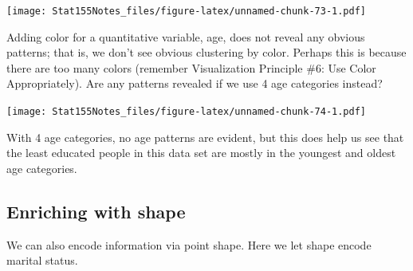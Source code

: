 \documentclass[]{book}
\newenvironment{Shaded}{\begin{snugshade}}{\end{snugshade}}
\newcommand{\CommentTok}[1]{\textcolor[rgb]{0.56,0.35,0.01}{\textit{#1}}}
\newcommand{\DataTypeTok}[1]{\textcolor[rgb]{0.13,0.29,0.53}{#1}}
\newcommand{\DecValTok}[1]{\textcolor[rgb]{0.00,0.00,0.81}{#1}}
\newcommand{\KeywordTok}[1]{\textcolor[rgb]{0.13,0.29,0.53}{\textbf{#1}}}
\newcommand{\NormalTok}[1]{#1}
\newcommand{\OperatorTok}[1]{\textcolor[rgb]{0.81,0.36,0.00}{\textbf{#1}}}
\newcommand{\StringTok}[1]{\textcolor[rgb]{0.31,0.60,0.02}{#1}}
\begin{document}
\texttt{[image: Stat155Notes\_files/figure-latex/unnamed-chunk-73-1.pdf]}

Adding color for a quantitative variable, age, does not reveal any obvious patterns; that is, we don't see obvious clustering by color. Perhaps this is because there are too many colors (remember Visualization Principle \#6: Use Color Appropriately). Are any patterns revealed if we use 4 age categories instead?

\begin{Shaded}
\end{Shaded}

\texttt{[image: Stat155Notes\_files/figure-latex/unnamed-chunk-74-1.pdf]}

With 4 age categories, no age patterns are evident, but this does help us see that the least educated people in this data set are mostly in the youngest and oldest age categories.

\hypertarget{enriching-with-shape}{%
\subsection{Enriching with shape}\label{enriching-with-shape}}

We can also encode information via point shape. Here we let shape encode marital status.
\end{document}

